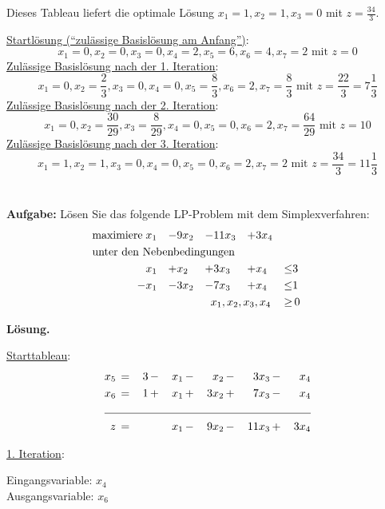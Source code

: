 \documentclass[10pt,a4paper,oneside,ngerman,numbers=noenddot]{scrartcl}
\begin{document}
		Dieses Tableau liefert die optimale Lösung $x_{1} = 1, x_{2} = 1, x_{3} = 0$ mit $z = \frac{34}{3}$.
		
		\underline{Startlösung ("`zulässige Basislösung am Anfang"')}:
		\[
			x_{1} = 0, x_{2} = 0, x_{3} = 0, x_{4} = 2, x_{5} = 6, x_{6} = 4, x_{7} = 2 \text{ mit } z = 0
		\]
		\underline{Zulässige Basislösung nach der 1. Iteration}:
		\[
			x_{1} = 0, x_{2} = \frac{2}{3}, x_{3} = 0, x_{4} = 0, x_{5} = \frac{8}{3}, x_{6} = 2, x_{7} = \frac{8}{3} \text{ mit } z = \frac{22}{3} = 7\frac{1}{3}
		\]
		\underline{Zulässige Basislösung nach der 2. Iteration}:
		\[
			x_{1} = 0, x_{2} = \frac{30}{29}, x_{3} = \frac{8}{29}, x_{4} = 0, x_{5} = 0, x_{6} = 2, x_{7} = \frac{64}{29} \text{ mit } z = 10
		\]
		\underline{Zulässige Basislösung nach der 3. Iteration}:
		\[
			x_{1} = 1, x_{2} = 1, x_{3} = 0, x_{4} = 0, x_{5} = 0, x_{6} = 2, x_{7} = 2 \text{ mit } z = \frac{34}{3} = 11\frac{1}{3}
		\]
\section{} %
	\textbf{Aufgabe:} Lösen Sie das folgende LP-Problem mit dem Simplexverfahren:
	\begin{alignat*}{5}
		\text{maximiere}\; & x_{1} &-& 9x_{2} &-& 11x_{3} &+& 3x_{4} && \\
		\multicolumn{10}{l}{\text{unter den Nebenbedingungen}} && \\
		\;& x_{1} &+& x_{2} &+& 3x_{3} &+& x_{4} &\leq & 3 \\
		\;-& x_{1} &-& 3x_{2} &-& 7x_{3} &+& x_{4} &\leq & 1 \\
		\multicolumn{8}{r}{$x_{1}, x_{2}, x_{3}, x_{4}$} \,&\geq &\, 0
	\end{alignat*}
	
	\textbf{Lösung.}
	
	\underline{Starttableau}:
	\begin{alignat*}{6}
		x_{5} \,&=&\, 3 \,&-&\, x_{1} \,&-&\, x_{2} \,&-&\, 3x_{3} \,&-&\, x_{4} \\
		x_{6} \,&=&\, 1 \,&+&\, x_{1} \,&+&\, 3x_{2} \,&+&\, 7x_{3}  \,&-&\, x_{4} \\ \cline{1 - 11}
		z \,&=&\, && x_{1} \,&-&\, 9x_{2} \,&-&\, 11x_{3} \,&+&\, 3x_{4}
	\end{alignat*}
	
	\underline{1. Iteration}:
		
	Eingangsvariable: $x_{4}$\\
	Ausgangsvariable: $x_{6}$
		
\end{document}
